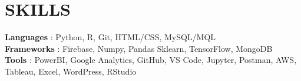 \documentclass[letterpaper,11pt]{article}
\begin{document}
%
\section{SKILLS}
 \begin{itemize}[leftmargin=0in, label={}]
    \small{\item{
     \textbf{Languages} {: Python, R, Git, HTML/CSS, MySQL/MQL}\vspace{2pt} \\
     \textbf{Frameworks}     {: Firebase, Numpy, Pandas Sklearn, TensorFlow, MongoDB} \\
     \textbf{Tools}     {: PowerBI, Google Analytics, GitHub, VS Code, Jupyter, Postman, AWS, Tableau, Excel, WordPress, RStudio}
     
    }}
 \end{itemize}


\end{document}
